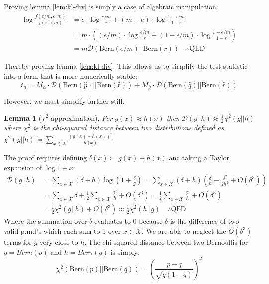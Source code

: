 \documentclass[]{article}
\newcommand{\Xcal}{\mathcal{X}}
\newcommand{\kl}{\mathcal{D}}
\newtheorem{lemma}[theorem]{Lemma}
\begin{document}
Proving lemma \ref{lem:kl-div} is simply a case of algebraic manipulation:
%
\begin{align}
	\log \frac{f(e/m, e, m)}{f(r, e, m)} &= e \cdot \log \frac{e/m}{r} + (m-e) \cdot \log \frac{1- e/m}{1 - r} \nonumber \\
	&= m \cdot \left( (e/m) \cdot \log \frac{e/m}{r} + (1 - e/m) \cdot \log \frac{1- e/m}{1 - r} \right) \nonumber \\
	&= m \kl \left( \textrm{Bern}(e/m) || \textrm{Bern}(r) \right) \quad \therefore \textrm{QED}
\end{align}

Thereby proving lemma \ref{lem:kl-div}. This allows us to simplify the test-statistic into a form that is more numerically stable:
%
\begin{equation}
	t_n = M_\alpha \cdot \kl\left( \textrm{Bern}(\hat{p}) || \textrm{Bern}(\hat{r})\right) + 
	M_\beta \cdot \kl\left( \textrm{Bern}(\hat{q}) || \textrm{Bern}(\hat{r})\right)
	\label{eqn:test-stat-compute-form}
\end{equation}

However, we must simplify further still.
%
\begin{lemma}[$\chi^2$ approximation]
	\label{lem:kl-approx-chi}
	For $g(x) \approx h(x)$ then $\kl(g || h) \approx \frac{1}{2} \chi^2(g || h)$ where $\chi^2$ is the chi-squared distance between two distributions defined as $\chi^2(g || h) \coloneqq \sum_{x \in \Xcal} \frac{(g(x)-h(x))^2}{h(x)}$ 
\end{lemma}

The proof requires defining $\delta(x) \coloneqq g(x) - h(x)$ and taking a Taylor expansion of $\log 1 + x$:
%
\begin{align*}
	\kl(g||h) &= \sum_{x \in \Xcal} (\delta + h) \log \left(1 + \frac{\delta}{g} \right) 
	= \sum_{x \in \Xcal} (\delta + h) \left( \frac{\delta}{h} - \frac{\delta^2}{2h^2} + O(\delta^3) \right)  \\
	&= \sum_{x \in \Xcal} \delta + \frac{1}{2} \sum_{x \in \Xcal} \frac{\delta^2}{h} + O(\delta^3) 
	= \frac{1}{2} \sum_{x \in \Xcal} \frac{\delta^2}{h} + O(\delta^3) \\
	&= \frac{1}{2} \chi^2(g||h) + O(\delta^3) \approx \frac{1}{2} \chi^2(h||g) \quad \therefore \textrm{QED}
\end{align*}
%
Where the summation over $\delta$ evaluates to 0 because $\delta$ is the difference of two valid p.m.f's which each sum to 1 over $x \in \Xcal$. We are able to neglect the $O(\delta^3)$ terms for $g$ very close to $h$. The chi-squared distance between two Bernoullis for $g = Bern(p)$ and $h = Bern(q)$ is simply:
%
\begin{equation}
\chi^2(\textrm{Bern}(p) || \textrm{Bern}(q)) = \left( \frac{p-q}{\sqrt{q(1-q)}} \right)^2
\end{equation}
\end{document}
